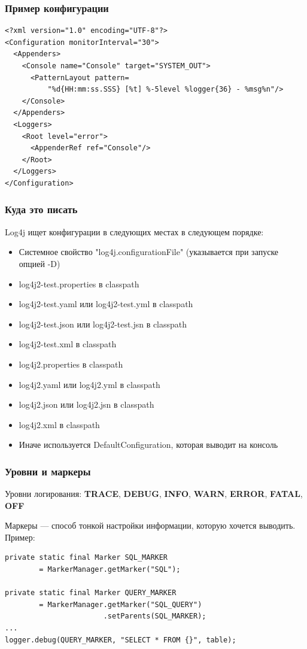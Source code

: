 \documentclass[xetex,mathserif,serif]{beamer}
\begin{document}
	\begin{frame}[fragile]
		\frametitle{Пример конфигурации}
		\begin{verbatim}
<?xml version="1.0" encoding="UTF-8"?>
<Configuration monitorInterval="30">
  <Appenders>
    <Console name="Console" target="SYSTEM_OUT">
      <PatternLayout pattern=
          "%d{HH:mm:ss.SSS} [%t] %-5level %logger{36} - %msg%n"/>
    </Console>
  </Appenders>
  <Loggers>
    <Root level="error">
      <AppenderRef ref="Console"/>
    </Root>
  </Loggers>
</Configuration>
		\end{verbatim}
\end{frame}

	\begin{frame}
		\frametitle{Куда это писать}
		Log4j ищет конфигурации в следующих местах в следующем порядке:
		\begin{itemize}
			\item Системное свойство "log4j.configurationFile" (указывается при запуске опцией -D)
			\item log4j2-test.properties в classpath
			\item log4j2-test.yaml или log4j2-test.yml в classpath
			\item log4j2-test.json или log4j2-test.jsn в classpath
			\item log4j2-test.xml в classpath
			\item log4j2.properties в classpath
			\item log4j2.yaml или log4j2.yml в classpath
			\item log4j2.json или log4j2.jsn в classpath
			\item log4j2.xml в classpath
			\item Иначе используется DefaultConfiguration, которая выводит на консоль
		\end{itemize}
	\end{frame}

	\begin{frame}[fragile]
		\frametitle{Уровни и маркеры}
		Уровни логирования: \textbf{TRACE}, \textbf{DEBUG}, \textbf{INFO}, \textbf{WARN}, \textbf{ERROR}, \textbf{FATAL}, \textbf{OFF}

		Маркеры --- способ тонкой настройки информации, которую хочется выводить. Пример:
		\begin{verbatim}
private static final Marker SQL_MARKER 
        = MarkerManager.getMarker("SQL");

private static final Marker QUERY_MARKER 
        = MarkerManager.getMarker("SQL_QUERY")
                       .setParents(SQL_MARKER);
...
logger.debug(QUERY_MARKER, "SELECT * FROM {}", table);
		\end{verbatim}
\end{frame}
\end{document}
